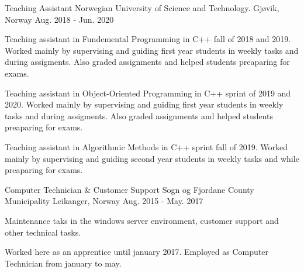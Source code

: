 \begin{cventries}
\cventry
    {Teaching Assistant} %
    {Norwegian University of Science and Technology.} %
    {Gjøvik, Norway} %
    {Aug. 2018 - Jun. 2020} %
    {
      \begin{cvitems} %
        \item {Teaching assistant in Fundemental Programming in C++ fall of 2018 and 2019. Worked mainly by supervising and guiding first year students in weekly tasks and during assigments. Also graded assignments and helped students preaparing for exams.}
        \item {Teaching assistant in Object-Oriented Programming in C++ sprint of 2019 and 2020. Worked mainly by supervising and guiding first year students in weekly tasks and during assigments. Also graded assignments and helped students preaparing for exams.}
        \item {Teaching assistant in Algorithmic Methods in C++ sprint fall of 2019. Worked mainly by supervising and guiding second year students in weekly tasks and while preaparing for exams.}
      \end{cvitems}
    }

  \cventry
    {Computer Technician \& Customer Support} %
    {Sogn og Fjordane County Municipality} %
    {Leikanger, Norway} %
    {Aug. 2015 - May. 2017} %
    {
      \begin{cvitems} %
        \item {Maintenance taks in the windows server environment, customer support and other technical tasks.}
        \item {Worked here as an apprentice until january 2017. Employed as Computer Technician from january to may.}
      \end{cvitems}
    }
\end{cventries}
